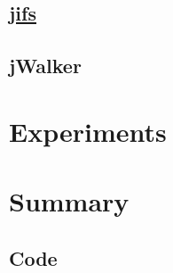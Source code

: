 \documentclass{article}
\newcommand{\jifs}{\href{https://github.com/jmbhughes/jifs}{jifs}\,}
\begin{document}
\subsection{\jifs}

\subsection{jWalker}

\section{Experiments}

\section{Summary}




\begin{appendices}
  \section{Code}
  \inputminted{java}{../src/Point.java}
  \inputminted{java}{../src/RandomWalk.java}
  \inputminted{java}{../src/PlaneAttracted3D.java}
\end{appendices}
\end{document}
